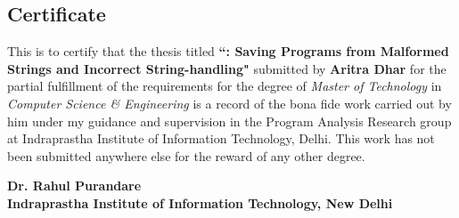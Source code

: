 
\begin{center}
\section*{Certificate}
\label{section:certificate}
\end{center}

This is to certify that the thesis titled \textbf{``\tool: Saving Programs from Malformed Strings and Incorrect
String-handling"} submitted by
\textbf{Aritra Dhar} for the partial fulfillment of the requirements for the
degree of \emph{Master of Technology} in \emph{Computer Science \& Engineering}
is a record of the bona fide work carried out by him under my guidance and
supervision in the Program Analysis Research group at Indraprastha Institute of
Information Technology, Delhi. This work has not been submitted anywhere else
for the reward of any other degree. \\ 

\vspace{1.8in}

\textbf{Dr. Rahul Purandare}\\
\textbf{Indraprastha Institute of Information Technology, New Delhi}